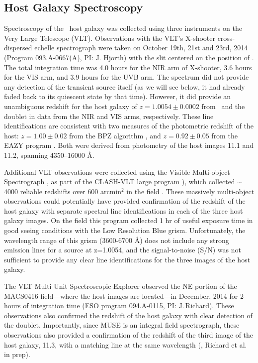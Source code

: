 \subsection{Host Galaxy Spectroscopy}\label{sec:Spectroscopy}

Spectroscopy of the \spock\ host galaxy was collected using three
instruments on the Very Large Telescope (VLT).  Observations with the
VLT's X-shooter cross-dispersed echelle spectrograph
\citep{Vernet:2011} were taken on October 19th, 21st and 23rd, 2014
(Program 093.A-0667(A), PI: J. Hjorth) with the slit centered on the
position of \spocktwo.  The total integration time was 4.0 hours for
the NIR arm of X-shooter, 3.6 hours for the VIS arm, and 3.9 hours for
the UVB arm.  The spectrum did not provide any detection of the
transient source itself (as we will see below, it had already faded
back to its quiescent state by that time).  However, it did provide an
unambiguous redshift for the host galaxy of $z=1.0054\pm0.0002$ from
\Ha\ and the  doublet in data from the NIR and VIS
arms, respectively.  These line identifications are consistent with
two measures of the photometric redshift of the host: $z=1.00\pm0.02$
from the BPZ algorithm \citep{Benitez:2000}, and $z=0.92\pm0.05$ from
the EAZY program \citep{Brammer:2008}.  Both were derived from \HST
photometry of the host images 11.1 and 11.2, spanning 4350--16000 \AA.

Additional VLT observations were collected using the Visible
Multi-object Spectrograph \citep[VIMOS][]{LeFevre:2003}, as part of
the CLASH-VLT large program \citep[Program 186.A-0.798; P.I.:
  P. Rosati;][]{Rosati:2014}), which collected $\sim$4000 reliable
redshifts over 600 arcmin$^2$ in the  field
\citep{Grillo:2015,Balestra:2016}.  These massively multi-object
observations could potentially have provided confirmation of the
redshift of the \spock host galaxy with separate spectral line
identifications in each of the three host galaxy images.  On the
 field this program collected 1 hr of useful exposure time in
good seeing conditions with the Low Resolution Blue grism.
Unfortunately, the wavelength range of this grism (3600-6700 \AA) does
not include any strong emission lines for a source at z=1.0054, and
the signal-to-noise (S/N) was not sufficient to provide any clear line
identifications for the three images of the \spock host galaxy.

The VLT Multi Unit Spectroscopic Explorer
\citep[MUSE;][]{Henault:2003,Bacon:2012} observed the NE portion of
the MACS0416 field---where the \spock host images are located---in
December, 2014 for 2 hours of integration time (ESO program
094.A-0115, PI: J.\,Richard).  These observations also confirmed the
redshift of the host galaxy with clear detection of the
 doublet.  Importantly, since MUSE is an integral
field spectrograph, these observations also provided a confirmation of
the redshift of the third image of the host galaxy, 11.3, with a
matching  line at the same wavelength
(\citealt{Caminha:2017}, Richard et al. in prep).

